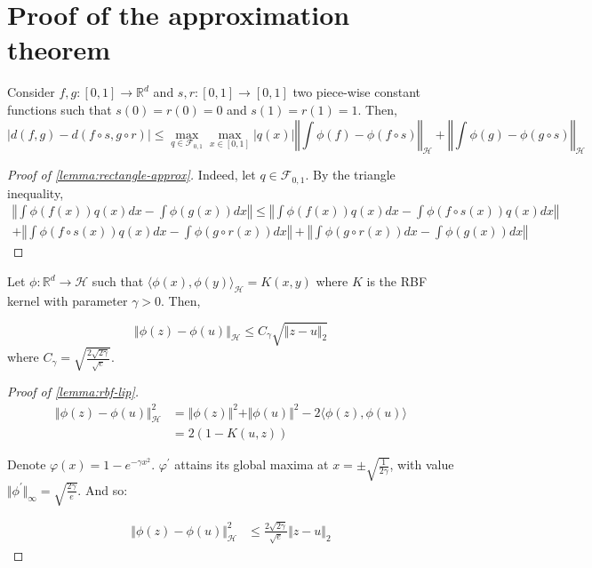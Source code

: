 \section{Proof of the approximation theorem}\label{sec:proof-rectangle-approx}
\begin{lemma}\label{lemma:rectangle-approx}
Consider $f, g:[0, 1] \to \mathbb R^d$ and $s, r:[0,1] \to[0,1]$ two piece-wise constant functions such that $s(0)=r(0)=0$ and $s(1)=r(1)=1$. Then,
\begin{equation}
    \vert d(f, g) - d(f \circ s, g\circ r) \vert \leq \max_{q\in\mathcal F_{0,1}}\max_{x\in[0,1]}\vert q(x) \vert \left\Vert \int \phi(f) - \phi(f\circ s)\right\Vert_{\mathcal H} + \left\Vert \int \phi(g)- \phi(g\circ s)\right\Vert_\mathcal H
\end{equation}

\end{lemma}
\begin{proof}[Proof of \cref{lemma:rectangle-approx}]
Indeed, let $q\in\mathcal F_{0,1}$. By the triangle inequality,
\begin{align}
\left\Vert \int \phi(f(x))q(x)dx - \int \phi(g(x))dx \right\Vert
\leq
\left\Vert \int \phi(f(x))q(x)dx - \int \phi(f\circ s(x))q(x)dx \right\Vert\\
+ \left\Vert \int \phi(f\circ s(x))q(x)dx - \int \phi(g\circ r(x))dx \right\Vert
+ \left\Vert \int \phi(g\circ r(x))dx - \int \phi(g(x))dx \right\Vert
\end{align}
\end{proof}

\begin{lemma}\label{lemma:rbf-lip}
Let $\phi:\mathbb R^d \to \mathcal H$ such that $\langle
\phi(x), \phi(y)\rangle_\mathcal H = K(x, y)$ where $K$ is the RBF kernel with parameter $\gamma > 0$. Then,

\begin{equation}
\left\Vert \phi(z) - \phi(u)\right\Vert_\mathcal H \leq C_\gamma\sqrt{\Vert z - u \Vert_2}
\end{equation}
where $C_\gamma = \sqrt{\frac{2\sqrt{2\gamma}}{\sqrt{e}}}$.
\end{lemma}

\begin{proof}[Proof of \cref{lemma:rbf-lip}]

\begin{align}
\Vert \phi(z) - \phi(u)\Vert_\mathcal H^2 &= \Vert \phi(z) \Vert^2+ \Vert \phi(u)\Vert^2 - 2 \langle \phi(z), \phi(u)\rangle\\
&= 2 \left(1 - K(u, z)\right)
\end{align}

Denote $\varphi(x) = 1- e^{-\gamma x^2}$. $\varphi^\prime$ attains its global maxima at $x = \pm \sqrt{\frac{1}{2\gamma}}$, with value $\Vert \phi^\prime\Vert_{\infty} = \sqrt{\frac{2\gamma}{e}}$. And so:

\begin{align}
\Vert \phi(z) - \phi(u)\Vert_\mathcal H^2 & \leq \frac{2\sqrt{2\gamma}}{\sqrt{e}}\Vert z - u \Vert_2
\end{align}
\end{proof}

